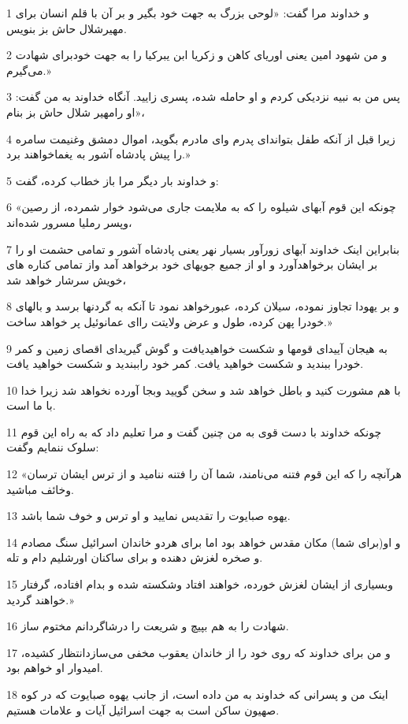 \par 1 و خداوند مرا گفت: «لوحی بزرگ به جهت خود بگیر و بر آن با قلم انسان برای مهیرشلال حاش بز بنویس.
\par 2 و من شهود امین یعنی اوریای کاهن و زکریا ابن یبرکیا را به جهت خودبرای شهادت می‌گیرم.»
\par 3 پس من به نبیه نزدیکی کردم و او حامله شده، پسری زایید. آنگاه خداوند به من گفت: «او رامهیر شلال حاش بز بنام،
\par 4 زیرا قبل از آنکه طفل بتواند‌ای پدرم و‌ای مادرم بگوید، اموال دمشق وغنیمت سامره را پیش پادشاه آشور به یغماخواهند برد.»
\par 5 و خداوند بار دیگر مرا باز خطاب کرده، گفت:
\par 6 «چونکه این قوم آبهای شیلوه را که به ملایمت جاری می‌شود خوار شمرده، از رصین وپسر رملیا مسرور شده‌اند،
\par 7 بنابراین اینک خداوند آبهای زورآور بسیار نهر یعنی پادشاه آشور و تمامی حشمت او را بر ایشان برخواهدآورد و او از جمیع جویهای خود برخواهد آمد واز تمامی کناره های خویش سرشار خواهد شد،
\par 8 و بر یهودا تجاوز نموده، سیلان کرده، عبورخواهد نمود تا آنکه به گردنها برسد و بالهای خودرا پهن کرده، طول و عرض ولایتت را‌ای عمانوئیل پر خواهد ساخت.»
\par 9 به هیجان آیید‌ای قومها و شکست خواهیدیافت و گوش گیرید‌ای اقصای زمین و کمر خودرا ببندید و شکست خواهید یافت. کمر خود راببندید و شکست خواهید یافت.
\par 10 با هم مشورت کنید و باطل خواهد شد و سخن گویید وبجا آورده نخواهد شد زیرا خدا با ما است.
\par 11 چونکه خداوند با دست قوی به من چنین گفت و مرا تعلیم داد که به راه این قوم سلوک ننمایم وگفت:
\par 12 «هرآنچه را که این قوم فتنه می‌نامند، شما آن را فتنه ننامید و از ترس ایشان ترسان وخائف مباشید.
\par 13 یهوه صبایوت را تقدیس نمایید و او ترس و خوف شما باشد.
\par 14 و او(برای شما) مکان مقدس خواهد بود اما برای هردو خاندان اسرائیل سنگ مصادم و صخره لغزش دهنده و برای ساکنان اورشلیم دام و تله. 
\par 15 وبسیاری از ایشان لغزش خورده، خواهند افتاد وشکسته شده و بدام افتاده، گرفتار خواهند گردید.»
\par 16 شهادت را به هم بپیچ و شریعت را درشاگردانم مختوم ساز.
\par 17 و من برای خداوند که روی خود را از خاندان یعقوب مخفی می‌سازدانتظار کشیده، امیدوار او خواهم بود.
\par 18 اینک من و پسرانی که خداوند به من داده است، از جانب یهوه صبایوت که در کوه صهیون ساکن است به جهت اسرائیل آیات و علامات هستیم.
